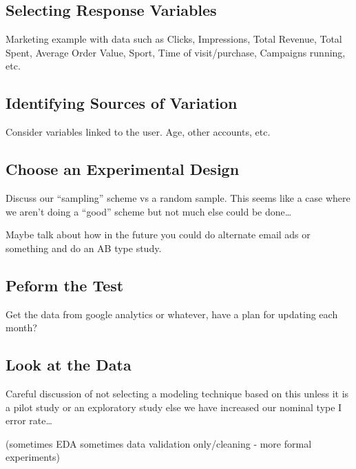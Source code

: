 \documentclass[
]{book}
\theoremstyle{definition}
\theoremstyle{definition}
\theoremstyle{definition}
\theoremstyle{remark}
\begin{document}
\hypertarget{selecting-response-variables}{%
\subsection{Selecting Response Variables}\label{selecting-response-variables}}

Marketing example with data such as Clicks, Impressions, Total Revenue, Total Spent, Average Order Value, Sport, Time of visit/purchase, Campaigns running, etc.

\hypertarget{identifying-sources-of-variation}{%
\subsection{Identifying Sources of Variation}\label{identifying-sources-of-variation}}

Consider variables linked to the user. Age, other accounts, etc.

\hypertarget{choose-an-experimental-design}{%
\subsection{Choose an Experimental Design }\label{choose-an-experimental-design}}

Discuss our ``sampling'' scheme vs a random sample. This seems like a case where we aren't doing a ``good'' scheme but not much else could be done\ldots{}

Maybe talk about how in the future you could do alternate email ads or something and do an AB type study.

\hypertarget{peform-the-test}{%
\subsection{Peform the Test }\label{peform-the-test}}

Get the data from google analytics or whatever, have a plan for updating each month?

\hypertarget{look-at-the-data}{%
\subsection{Look at the Data }\label{look-at-the-data}}

Careful discussion of not selecting a modeling technique based on this unless it is a pilot study or an exploratory study else we have increased our nominal type I error rate\ldots{}

(sometimes EDA sometimes data validation only/cleaning - more formal experiments)
\end{document}
